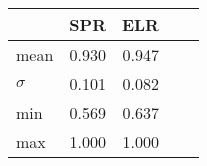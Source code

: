 \begin{tabular}{ l r r r r }
\toprule
         &  SPR   &  ELR   \\
\midrule
mean     &  0.930 & 0.947 \\
$\sigma$ &  0.101 &  0.082 \\
min      &  0.569 & 0.637 \\
max      &  1.000 & 1.000 \\
\bottomrule
\end{tabular}
